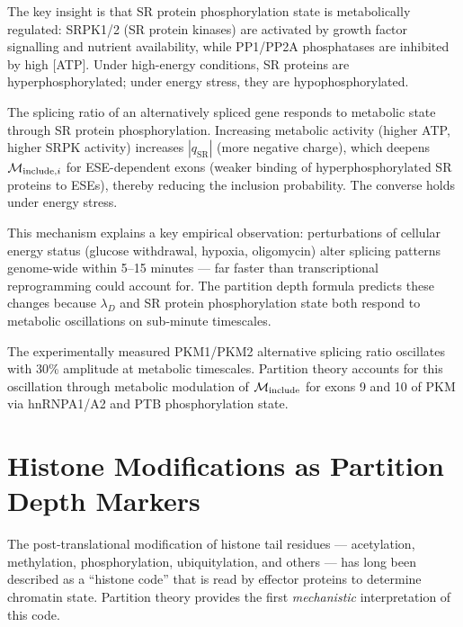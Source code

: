 The key insight is that SR protein phosphorylation state is metabolically
regulated: SRPK1/2 (SR protein kinases) are activated by growth factor
signalling and nutrient availability, while PP1/PP2A phosphatases are
inhibited by high [ATP]. Under high-energy conditions, SR proteins are
hyperphosphorylated; under energy stress, they are hypophosphorylated.

\begin{corollary}
\label{cor:metabolic_splicing}
The splicing ratio of an alternatively spliced gene responds to metabolic state
through SR protein phosphorylation. Increasing metabolic activity
(higher ATP, higher SRPK activity) increases $|q_{\mathrm{SR}}|$
(more negative charge), which deepens $\mathcal{M}_{\mathrm{include},i}$ for
ESE-dependent exons (weaker binding of hyperphosphorylated SR proteins to
ESEs), thereby reducing the inclusion probability.
The converse holds under energy stress.
\end{corollary}

This mechanism explains a key empirical observation: perturbations of cellular
energy status (glucose withdrawal, hypoxia, oligomycin) alter splicing patterns
genome-wide within 5--15 minutes --- far faster than transcriptional
reprogramming could account for. The partition depth formula predicts these
changes because $\lambda_D$ and SR protein phosphorylation state both respond
to metabolic oscillations on sub-minute timescales.

\begin{keyresult}
The experimentally measured PKM1/PKM2 alternative splicing ratio oscillates
with 30\% amplitude at metabolic timescales. Partition theory accounts for this
oscillation through metabolic modulation of $\mathcal{M}_{\mathrm{include}}$ for
exons 9 and 10 of PKM via hnRNPA1/A2 and PTB phosphorylation state.
\end{keyresult}

\section{Histone Modifications as Partition Depth Markers}
\label{sec:histone_modifications}

The post-translational modification of histone tail residues --- acetylation,
methylation, phosphorylation, ubiquitylation, and others --- has long been
described as a ``histone code'' that is read by effector proteins to determine
chromatin state. Partition theory provides the first \emph{mechanistic}
interpretation of this code.

